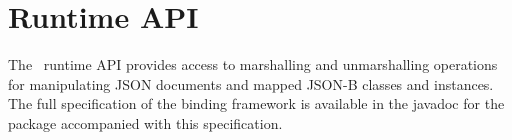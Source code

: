 \chapter{Runtime API}
\label{runtime}

The \jsonb\ runtime API provides access to marshalling and unmarshalling operations for manipulating JSON documents and mapped JSON-B classes and instances. The full specification of the binding framework is available in the javadoc for the  package accompanied with this specification.
